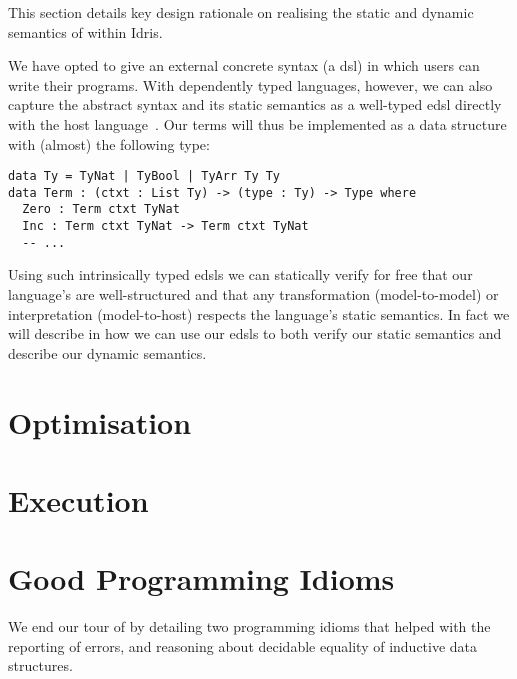 \documentclass[%
draft, %
a4paper,
UKenglish,
cleveref,
autoref,
thm-restate,
pdfa
]{oasics-v2021}
\begin{document}
This section details key design rationale on realising the static and dynamic semantics of \Velo{} within Idris.

We have opted to give \Velo{} an external concrete syntax (a \ac{dsl}) in which users can write their programs.
%
With dependently typed languages, however, we can also capture the abstract syntax and its static semantics as a well-typed \ac{edsl} directly with the host language~\cite{Augustsson1999edt}.
Our terms will thus be implemented as a data structure with (almost) the following type:

\begin{Verbatim}
data Ty = TyNat | TyBool | TyArr Ty Ty
data Term : (ctxt : List Ty) -> (type : Ty) -> Type where
  Zero : Term ctxt TyNat
  Inc : Term ctxt TyNat -> Term ctxt TyNat
  -- ...
\end{Verbatim}

\noindent

Using such intrinsically typed \acp{edsl} we can statically verify for free that our language's are well-structured and that any transformation (model-to-model) or interpretation (model-to-host) respects the language's static semantics.
In fact we will describe in  how we can use our \acp{edsl} to both verify our static semantics and describe our dynamic semantics.






\section{Optimisation}
\label{sec:compiler-pass}



\section{Execution}
\label{sec:semantics}



\section{Good Programming Idioms}
\label{sec:idioms}

We end our tour of \Velo{} by detailing two programming idioms that helped with the reporting of errors, and reasoning about decidable equality of inductive data structures.
\end{document}

